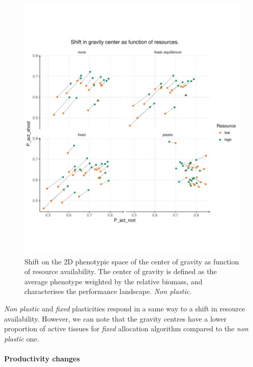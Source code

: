 \begin{figure}\label{fig:gravity_shift_resource}
\includegraphics[width = \textwidth]{./2_PP/Figures/Landscape/ld_gravity_resourceall.pdf}
\caption{Shift on the 2D phenotypic space of the center of gravity as function of resource availability. The center of gravity is defined as the average phenotype weighted by the relative biomass, and characterises the performance landscape. \textit{Non plastic}.}
\end{figure}

\textit{Non plastic} and \textit{fixed} plasticities respond in a same way to a shift in resource availability. However, we can note that the gravity centres have a lower proportion of active tissues for \textit{fixed} allocation algorithm compared to the \textit{non plastic} one.


\paragraph{Productivity changes}

